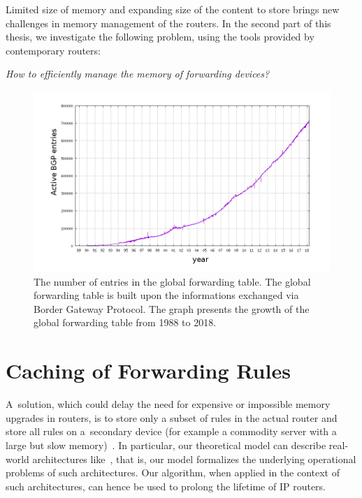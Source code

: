Limited size of memory and expanding size of the content to store brings new challenges in memory management of the routers.
In the second part of this thesis, we investigate the following problem, using the tools provided by contemporary routers:
\begin{center}
  \emph{How to efficiently manage the memory of forwarding devices?}
\end{center}


\begin{figure}[t]
\centering
\includegraphics[width=0.59\columnwidth]{figs/bgp-entries.png}
\caption{The number of entries in the global forwarding table. The global forwarding table is built upon the informations exchanged via Border Gateway Protocol. The graph presents the growth of the global forwarding table from 1988 to 2018.}\label{fig:bgp-entries}
\end{figure}

\section{Caching of Forwarding Rules}

A~solution, which could delay
the need for expensive or impossible memory upgrades in routers, is to store
only a subset of rules in the actual router and store all rules on a~secondary
device (for example a commodity server with a large but slow
memory)~\cite{cacheflow,route-caching-flat,prefix-caching,fib-caching-non-overlapping,fibium-zipf}.
In particular, our
theoretical model can describe real-world architectures
like~\cite{cacheflow,fibium-zipf},
that is, our model formalizes the underlying operational
problems of such architectures. Our 
algorithm, when applied in the context of such architectures, can 
hence be used to prolong the lifetime of IP routers.


